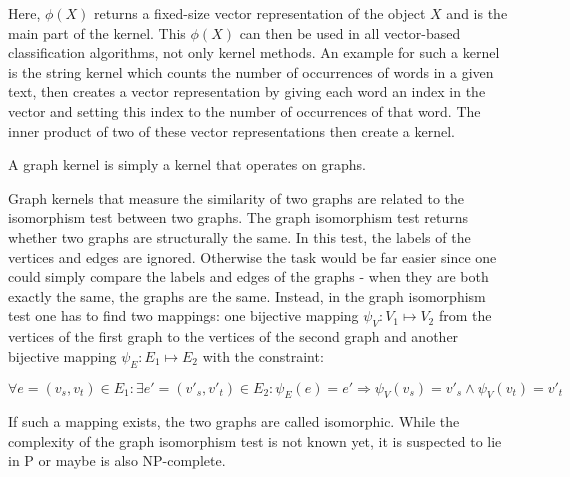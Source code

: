 Here, $\phi(X)$ returns a fixed-size vector representation of the object $X$ and is the main part of the kernel.
This $\phi(X)$ can then be used in all vector-based classification algorithms, not only kernel methods.
An example for such a kernel is the string kernel which counts the number of occurrences of words in a given text, then creates a vector representation by giving each word an index in the vector and setting this index to the number of occurrences of that word. The inner product of two of these vector representations then create a kernel.

A graph kernel is simply a kernel that operates on graphs.

Graph kernels that measure the similarity of two graphs are related to the isomorphism test between two graphs.
The graph isomorphism test returns whether two graphs are structurally the same.
In this test, the labels of the vertices and edges are ignored. Otherwise the task would be far easier since one could simply compare the labels and edges of the graphs - when they are both exactly the same, the graphs are the same.
Instead, in the graph isomorphism test one has to find two mappings: one bijective mapping $\psi_{V}: V_1 \mapsto V_2$ from the vertices of the first graph to the vertices of the second graph and another bijective mapping $\psi_{E}: E_1 \mapsto E_2$ with the constraint:

\begin{equation*}
    \forall e = (v_s, v_t) \in E_1:
    \exists e' = (v'_s, v'_t) \in E_2:
    \psi_{E}(e) = e'
    \Rightarrow
    \psi_{V}(v_s) = v'_s
    \land
    \psi_{V}(v_t) = v'_t
\end{equation*}

If such a mapping exists, the two graphs are called isomorphic.
While the complexity of the graph isomorphism test is not known yet, it is suspected to lie in P or maybe is also NP-complete.



